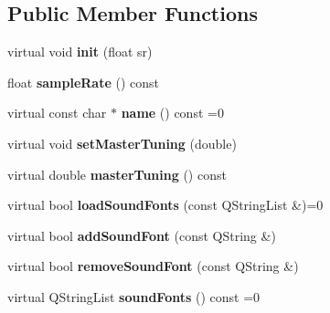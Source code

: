 \subsection*{Public Member Functions}
\begin{DoxyCompactItemize}
\item 
\mbox{\label{class_ms_1_1_synthesizer_afae81b084c72cce68466b9c8631e030e}} 
virtual void {\bfseries init} (float sr)
\item 
\mbox{\label{class_ms_1_1_synthesizer_a6d2fd5ec5d5f80696ebc83736943f23d}} 
float {\bfseries sample\+Rate} () const
\item 
\mbox{\label{class_ms_1_1_synthesizer_a1a4eb6c510fc211a9e2c95e07712aba6}} 
virtual const char $\ast$ {\bfseries name} () const =0
\item 
\mbox{\label{class_ms_1_1_synthesizer_aa44808c442eb1e860ba6331dd67c77e8}} 
virtual void {\bfseries set\+Master\+Tuning} (double)
\item 
\mbox{\label{class_ms_1_1_synthesizer_aecc32dd0f133b6ed79e8a521a9679641}} 
virtual double {\bfseries master\+Tuning} () const
\item 
\mbox{\label{class_ms_1_1_synthesizer_a0e524c9a40522a4dd0e4328390bf58ed}} 
virtual bool {\bfseries load\+Sound\+Fonts} (const Q\+String\+List \&)=0
\item 
\mbox{\label{class_ms_1_1_synthesizer_ad86caa30e7b390303030c8342a29abda}} 
virtual bool {\bfseries add\+Sound\+Font} (const Q\+String \&)
\item 
\mbox{\label{class_ms_1_1_synthesizer_a9bbb1200179ce31929693c124d89ed70}} 
virtual bool {\bfseries remove\+Sound\+Font} (const Q\+String \&)
\item 
\mbox{\label{class_ms_1_1_synthesizer_ac021121461e98b7eb87d1e9042eb2d96}} 
virtual Q\+String\+List {\bfseries sound\+Fonts} () const =0
\item 
\mbox{\label{class_ms_1_1_synthesizer_a2546e6ee088f95151805bbaeca657907}} 

\end{DoxyCompactItemize}
